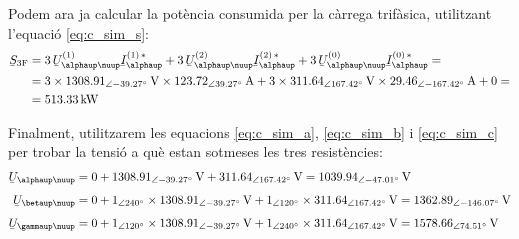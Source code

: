 \begin{exemple}
    Podem ara ja calcular la pot\`{e}ncia consumida per la c\`{a}rrega
    trif\`{a}sica, utilitzant l'equaci\'{o} \eqref{eq:c_sim_s}:
    \[
    \begin{split}
    \cmplx{S}\ped{3F} &=  3\, \cmplx{U}_{\alphaup\nuup}^{(1)}
    \cmplx{I}_\alphaup^{(1)\,*} + 3\, \cmplx{U}_{\alphaup\nuup}^{(2)}
    \cmplx{I}_\alphaup^{(2)\,*} +  3\,
    \cmplx{U}_{\alphaup\nuup}^{(0)}  \cmplx{I}_\alphaup^{(0)\,*} = \\
    &= 3 \times \SIpd{1308,91}{-39,27}{V} \times
    \SIpd{123,72}{39,27}{A} + 3 \times
    \SIpd{311,64}{167,42}{V} \times \SIpd{29,46}{-167,42}{A} + 0 = \\
    &= \SI{513,33}{kW}
    \end{split}
    \]

    Finalment, utilitzarem les equacions \eqref{eq:c_sim_a},
    \eqref{eq:c_sim_b} i \eqref{eq:c_sim_c} per trobar la tensi\'{o} a qu\`{e}
    estan sotmeses les tres resist\`{e}ncies:
    \begin{align*}
        \cmplx{U}_{\alphaup\nuup} &= 0 + \SIpd{1308,91}{-39,27}{V} +
        \SIpd{311,64}{167,42}{V}  =
        \SIpd{1039,94}{-47,01}{V} \\[1ex]
        \cmplx{U}_{\betaup\nuup} &= 0 + \numpd{1}{240} \times
        \SIpd{1308,91}{-39,27}{V} +
        \numpd{1}{120} \times
        \SIpd{311,64}{167,42}{V}  =
        \SIpd{1362,89}{-146,07}{V}    \\[1ex]
        \cmplx{U}_{\gammaup\nuup} &= 0 + \numpd{1}{120} \times
        \SIpd{1308,91}{-39,27}{V} +
        \numpd{1}{240} \times \SIpd{311,64}{167,42}{V}  =
        \SIpd{1578,66}{74,51}{V}
    \end{align*}
\end{exemple}
